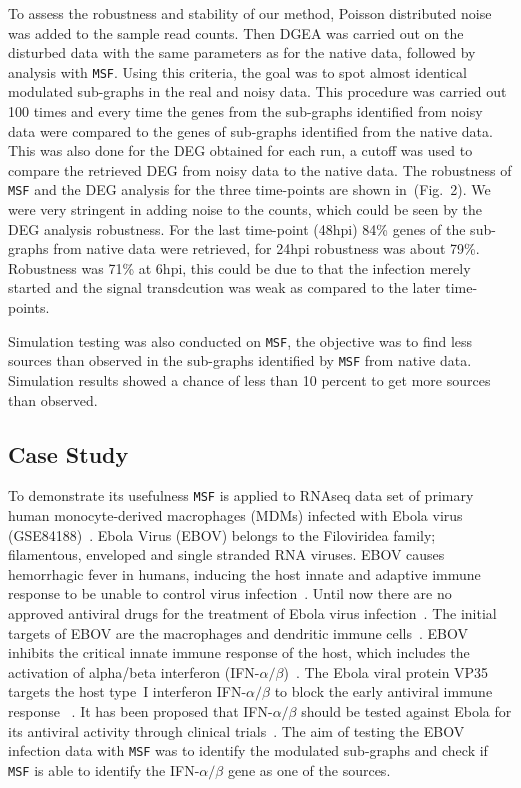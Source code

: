 \documentclass[twocolumn]{article}
\begin{document}
To assess the robustness and stability of our method, Poisson distributed noise was added to the sample read counts. Then DGEA was carried out on the disturbed data with the same parameters as for the native data, followed by analysis with \texttt{MSF}. Using this criteria, the goal was to spot almost
identical modulated sub-graphs in the real and noisy data. This procedure was carried out 100 times and every time the genes from the sub-graphs identified from noisy data were compared to the genes of sub-graphs identified from the native data. This was also done for the DEG obtained for each run, a cutoff was used to compare the retrieved DEG from noisy data to the native data.  The robustness of \texttt{MSF} and the DEG analysis for the three time-points are shown in~(Fig.~2). We were very stringent in adding noise to the counts, which could be seen by the DEG analysis robustness. For the last time-point (48hpi) 84\% genes of the sub-graphs from native data were retrieved, for 24hpi robustness was about 79\%. Robustness was 71\% at 6hpi, this could be due to that the infection merely started and the signal transdcution was weak as compared to the later time-points.

Simulation testing was also conducted on \texttt{MSF}, the objective was to find less sources than observed in the sub-graphs identified by \texttt{MSF} from native data. Simulation results showed a chance of less than 10 percent to get more sources than observed.

\subsection*{Case Study}

To demonstrate its usefulness \texttt{MSF} is applied to RNAseq data
set of primary human monocyte-derived macrophages (MDMs) infected with
Ebola virus (GSE84188)~\cite{Olejnik}. Ebola Virus (EBOV)
belongs to the Filoviridea family; filamentous, enveloped and single
stranded RNA viruses. EBOV causes hemorrhagic fever in humans,
inducing the host innate and adaptive immune response to be unable to
control virus infection~\cite{Prins}. Until now there are no approved
antiviral drugs for the treatment of Ebola virus infection~\cite{Konde,Rhein}. 
The initial targets of EBOV are the macrophages and
dendritic immune cells~\cite{Falasca,Rhein}. EBOV inhibits the critical
innate immune response of the host, which includes the activation of
alpha/beta interferon (IFN-$\alpha /
\beta$)~\cite{Prins,Konde,Cardenas}. The Ebola viral protein VP35
targets the host type~I interferon IFN-$\alpha / \beta$ to block the
early antiviral immune response
~\cite{Prins,Konde,Falasca,Cardenas,Olejnik}. It has been proposed
that IFN-$\alpha / \beta$  should be
tested against Ebola for its antiviral activity through clinical trials~\cite{Konde}. The aim of testing the EBOV infection data with \texttt{MSF} was to identify the modulated sub-graphs and check if \texttt{MSF} is able to identify the IFN-$\alpha / \beta$ gene as one of the sources.
\end{document}
